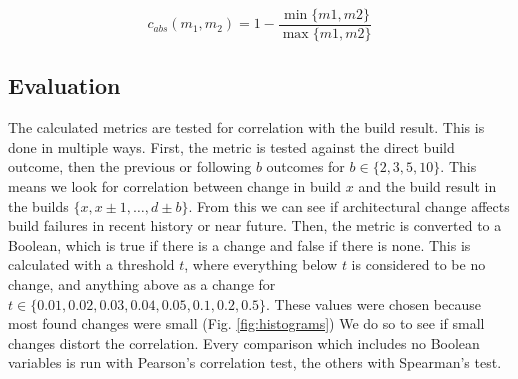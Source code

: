 \documentclass[conference]{IEEEtran}
\begin{document}
\begin{equation} \label{eq:absDiff}
	c_{abs}(m_1, m_2) = 1 - \frac{\min\{m1, m2\}}{\max\{m1, m2\}}
\end{equation} 

\subsection{Evaluation}

The calculated metrics are tested for correlation with the build result. This is done in multiple ways. First, the metric is tested against the direct build outcome, then the previous or following $b$ outcomes for $b \in \{2, 3, 5, 10\}$. This means we look for correlation between change in build $x$ and the build result in the builds $\{x, x \pm 1, \hdots, d \pm b\}$. From this we can see if architectural change affects build failures in recent history or near future. 
Then, the metric is converted to a Boolean, which is true if there is a change and false if there is none. This is calculated with a threshold $t$, where everything below $t$ is considered to be no change, and anything above as a change for $t \in \{0.01, 0.02, 0.03, 0.04, 0.05, 0.1, 0.2, 0.5\}$. These values were chosen because most found changes were small (Fig. \ref{fig:histograms}) We do so to see if small changes distort the correlation. Every comparison which includes no Boolean variables is run with Pearson's correlation test, the others with Spearman's test. 
\end{document}
